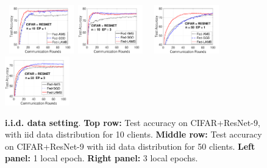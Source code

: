 \documentclass[twoside]{article}
\begin{document}
\begin{figure}[t]
    \begin{center}
        \mbox{
        \hspace{-0.05in}\includegraphics[width=0.25\textwidth]{new_figure/cifar_testerror_resnet_ep1_client10_iid1_SGD.pdf}
        \hspace{-0.13in} \includegraphics[width=0.25\textwidth]{new_figure/cifar_testerror_resnet_ep3_client10_iid1_SGD.pdf}
        }
        \mbox{
        \hspace{-0.05in}\includegraphics[width=0.25\textwidth]{new_figure/cifar_testerror_resnet_ep1_client50_iid1_SGD.pdf}
        \hspace{-0.1in}\includegraphics[width=0.25\textwidth]{new_figure/cifar_testerror_resnet_ep3_client50_iid1_SGD.pdf}
        }
    \end{center}
    \vspace{0.05in}
	\caption{\textbf{i.i.d. data setting}. \textbf{Top row:} Test accuracy on CIFAR+ResNet-9, with iid data distribution for 10 clients. 
	\textbf{Middle row:} Test accuracy on CIFAR+ResNet-9 with iid data distribution for 50 clients.
	\textbf{Left panel:} 1 local epoch. \textbf{Right panel:} 3 local epochs. 
	}
	\label{fig:iid}
	\vspace{-0.1in}
\end{figure}
\end{document}
